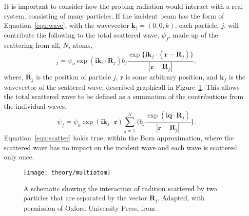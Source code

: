 It is important to consider how the probing radiation would interact with a real system, consisting of many particles.
If the incident beam has the form of Equation~\ref{equ:wave}, with the wavevector $\mathbf{k}_i = (0, 0, k)$, each particle, $j$, will contribute the following to the total scattered wave, $\psi_f$, made up of the scattering from all, $N$, atoms,
%
\begin{equation}
    [\delta\psi_f]_j = \psi_o\exp{(\mathbf{ik}_i\cdot \mathbf{R}_j)}b_j\frac{\exp{\big\{\mathbf{ik}_f\cdot (\mathbf{r}-\mathbf{R}_j)\big\}}}{|\mathbf{r}-\mathbf{R}_j|},
\end{equation}
%
where, $\mathbf{R}_j$ is the position of particle $j$, $\mathbf{r}$ is some arbitrary position, and $\mathbf{k}_f$ is the wavevector of the scattered wave, described graphicall in Figure~\ref{fig:multiatom}.
This allows the total scattered wave to be defined as a summation of the contributions from the individual waves,
%
\begin{equation}
    \psi_f = \psi_o \exp{(\mathbf{ik}_f\cdot\mathbf{r})}\sum_{j=1}^{N}\bigg\{b_j \frac{\exp{(\mathbf{iq}\cdot \mathbf{R}_j)}}{|\mathbf{r}-\mathbf{R}_j|}\bigg\}.
    \label{equ:scatter}
\end{equation}
%
Equation~\ref{equ:scatter} holds true, within the Born approximation, where the scattered wave has no impact on the incident wave and each wave is scattered only once.
%
\begin{figure}[t]
    \forcerectofloat
    \centering
    \texttt{[image: theory/multiatom]}
    \caption{A schematic showing the interaction of radition scattered by two particles that are separated by the vector $\mathbf{R}_j$. Adapted, with permission of Oxford University Press, from \cite{sivia_elementary_2011}.}
    \label{fig:multiatom}
\end{figure}
%

